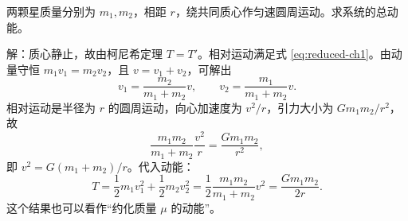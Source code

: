 \begin{example}[双星系统的动能]
两颗星质量分别为 $m_1,m_2$，相距 $r$，绕共同质心作匀速圆周运动。求系统的总动能。

\begin{center}
\end{center}

解：质心静止，故由柯尼希定理 $T=T'$。相对运动满足式 \eqref{eq:reduced-ch1}。由动量守恒 $m_1v_1=m_2v_2$，且 $v=v_1+v_2$，可解出
\[
v_1=\frac{m_2}{m_1+m_2}v,\qquad
v_2=\frac{m_1}{m_1+m_2}v .
\]
相对运动是半径为 $r$ 的圆周运动，向心加速度为 $v^2/r$，引力大小为 $Gm_1m_2/r^2$，故
\[
\frac{m_1m_2}{m_1+m_2}\frac{v^2}{r}
=\frac{Gm_1m_2}{r^2},
\]
即 $v^2=G(m_1+m_2)/r$。代入动能：
\[
T=\frac12m_1v_1^2+\frac12m_2v_2^2
=\frac12\frac{m_1m_2}{m_1+m_2}v^2
=\frac{Gm_1m_2}{2r}.
\]
这个结果也可以看作“约化质量 $\mu$ 的动能”。
\end{example}

